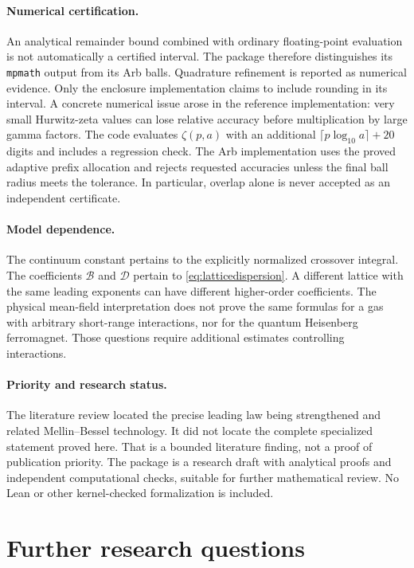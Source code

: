 \documentclass[11pt,a4paper]{article}
\numberwithin{equation}{section}
\theoremstyle{definition}
\newcommand{\Bconst}{\mathcal B}
\newcommand{\Dconst}{\mathcal D}
\begin{document}
\paragraph{Numerical certification.}
An analytical remainder bound combined with ordinary floating-point
evaluation is not automatically a certified interval. The package
therefore distinguishes its \texttt{mpmath} output from its Arb balls.
Quadrature refinement is reported as numerical evidence. Only the
enclosure implementation claims to include rounding in its interval.
A concrete numerical issue arose in the reference implementation:
very small Hurwitz-zeta values can lose relative accuracy before
multiplication by large gamma factors. The code evaluates
$\zeta(p,a)$ with an additional $\lceil p\log_{10}a\rceil+20$
digits and includes a regression check. The Arb implementation uses
the proved adaptive prefix allocation and rejects requested accuracies
unless the final ball radius meets the tolerance. In particular,
overlap alone is never accepted as an independent certificate.

\paragraph{Model dependence.}
The continuum constant pertains to the explicitly normalized crossover
integral. The coefficients $\Bconst$ and $\Dconst$ pertain to
\eqref{eq:latticedispersion}. A different lattice with the same leading
exponents can have different higher-order coefficients. The physical
mean-field interpretation does not prove the same formulas for a gas
with arbitrary short-range interactions, nor for the quantum
Heisenberg ferromagnet. Those questions require additional estimates
controlling interactions.

\paragraph{Priority and research status.}
The literature review located the precise leading law being
strengthened and related Mellin--Bessel technology. It did not locate
the complete specialized statement proved here. That is a bounded
literature finding, not a proof of publication priority. The package is
a research draft with analytical proofs and independent computational
checks, suitable for further mathematical review. No Lean or other
kernel-checked formalization is included.

\section{Further research questions}
\label{sec:future}
\end{document}
